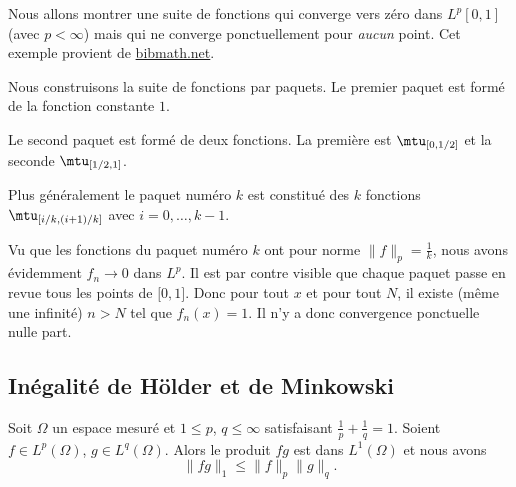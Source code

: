 \begin{example}
    Nous allons montrer une suite de fonctions qui converge vers zéro dans \( L^p[0,1]\) (avec \( p<\infty\)) mais qui ne converge ponctuellement pour \emph{aucun} point. Cet exemple provient de \href{http://www.bibmath.net/dico/index.php?action=affiche&quoi=./b/bosseglissante.html}{bibmath.net}. 


    Nous construisons la suite de fonctions par paquets. Le premier paquet est formé de la fonction constante \( 1\).

    Le second paquet est formé de deux fonctions. La première est \( \mtu_{\mathopen[0 , 1/2 \mathclose]}\) et la seconde \( \mtu_{\mathopen[ 1/2 , 1 \mathclose]}\).

    Plus généralement le paquet numéro \( k\) est constitué des \( k\) fonctions \( \mtu_{\mathopen[ i/k , (i+1)/k \mathclose]}\) avec \( i=0,\ldots, k-1\).

    Vu que les fonctions du paquet numéro \( k\) ont pour norme \( \| f \|_p=\frac{1}{ k }\), nous avons évidemment \( f_n\to 0\) dans \( L^p\). Il est par contre visible que chaque paquet passe en revue tous les points de \( \mathopen[ 0 , 1 \mathclose]\). Donc pour tout \( x\) et pour tout \( N\), il existe (même une infinité) \( n>N\) tel que \( f_n(x)=1\). Il n'y a donc convergence ponctuelle nulle part.
\end{example}

\subsection{Inégalité de Hölder et de Minkowski}

\begin{proposition}       \label{ProptYqspT}
    Soit \( \Omega\) un espace mesuré et \( 1\leq p\), \( q\leq\infty\) satisfaisant \( \frac{1}{ p }+\frac{1}{ q }=1\). Soient \( f\in L^p(\Omega)\), \( g\in L^q(\Omega)\). Alors le produit \( fg\) est dans \( L^1(\Omega)\) et nous avons
    \begin{equation}
        \| fg \|_1\leq \| f \|_p\| g \|_q.
    \end{equation}
\end{proposition}

